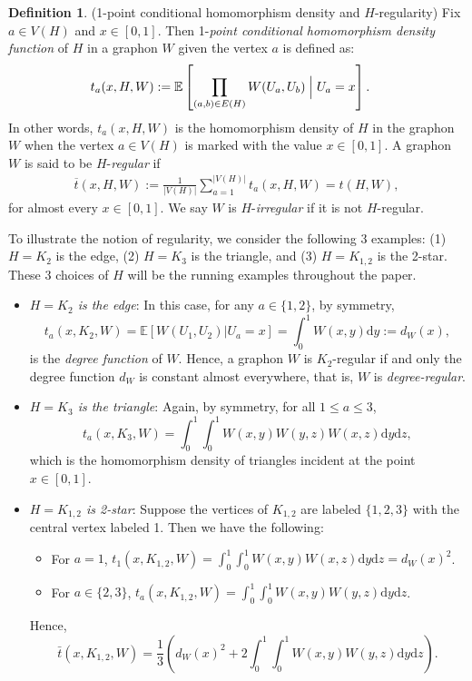 \documentclass[11pt,reqno]{amsart}
\numberwithin{equation}{section}
\theoremstyle{definition}
\newtheorem{definition}{Definition}[section]
\begin{document}
\begin{definition}\label{defn:tabxyHW}(1-point conditional homomorphism density and $H$-regularity)
Fix $a \in V(H)$ and $x \in [0, 1]$. Then 1-{\it point conditional homomorphism density function} of $H$ in a graphon $W$ given the vertex $a$ is defined as: 
    \begin{align*}
        t_a(x,H,W) &:=\mathbb{E}\left[\prod_{(a,b)\in E(H)}W(U_{a},U_{b})\Bigm|U_a = x \right] .
    \end{align*}
   In other words,  $t_a(x, H, W)$ is the homomorphism density of $H$ in the graphon $W$ when the vertex $a \in V(H)$ is marked with the value $x \in [0, 1]$. A graphon $W$ is said to be $H$-\emph{regular} if
\begin{align}\label{eq:H_regular}
 \overline{t}(x,H,W) :=   \frac{1}{|V(H)|}\sum_{a=1}^{|V(H)|}t_a(x,H,W)=t(H,W),
\end{align}
for almost every $x \in [0, 1]$. We say $W$ is $H$-{\it irregular} if it is not $H$-regular. 
\end{definition}

To illustrate the notion of regularity, we consider the following 3 examples: (1) $H=K_2$ is the edge, (2) $H=K_3$ is the triangle, and (3) $H=K_{1, 2}$ is the 2-star. These 3 choices of $H$ will be the running examples throughout the paper. 

\begin{itemize} 

\item {\it $H=K_2$ is the edge}: In this case, for any $a \in \{1, 2\}$, by symmetry, 
$$t_a(x, K_2, W) = \mathbb E[W(U_1, U_2)|U_a=x] = \int_0^1 W(x, y) \mathrm d y := d_W(x) , $$
is the {\it degree function} of $W$. Hence, a graphon $W$ is $K_2$-regular if and only the degree function $d_W$ is constant almost everywhere, that is, $W$ is {\it degree-regular}. 


\item {\it $H=K_3$ is the triangle}: Again, by symmetry, for all $1 \leq a \leq 3$, 
$$t_a(x, K_3, W) = \int_0^1 \int_0^1 W(x, y) W(y, z) W(x, z) \mathrm d y \mathrm d z,$$
which is the homomorphism density of triangles incident at the point $x \in [0, 1]$. 


\item {\it $H=K_{1, 2}$ is 2-star}: Suppose the vertices of $K_{1, 2}$ are labeled $\{ 1, 2, 3\}$ with the central vertex labeled 1. Then we have the following: 

\begin{itemize}

\item For $a=1$, $t_1(x, K_{1, 2}, W) = \int_0^1 \int_0^1 W(x, y) W(x, z) \mathrm d y \mathrm d z = d_W(x)^2$. 

\item For $a \in \{2, 3\}$, $t_a(x, K_{1, 2}, W) = \int_0^1 \int_0^1 W(x, y) W(y, z) \mathrm d y \mathrm d z$. 

\end{itemize} 
Hence, 
$$\bar t(x, K_{1, 2}, W) = \frac{1}{3} \left( d_W(x)^2 + 2 \int_0^1 \int_0^1 W(x, y) W(y, z) \mathrm d y \mathrm d z \right) . $$
 
\end{itemize}
\end{document}
